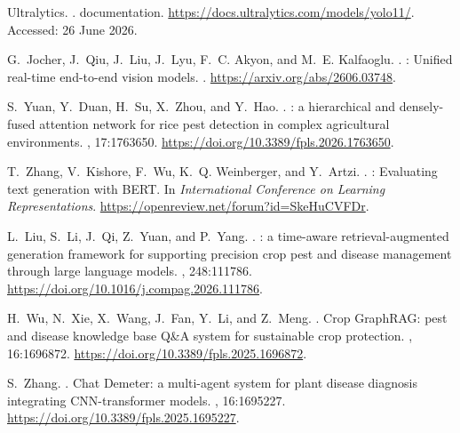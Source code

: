 ﻿\documentclass[11pt]{article}
\begin{document}
\begin{thebibliography}{}
Ultralytics.
.
 documentation.
\newblock \url{https://docs.ultralytics.com/models/yolo11/}. Accessed: 26 June 2026.

G.~Jocher, J.~Qiu, J.~Liu, J.~Lyu, F.~C. Akyon, and M.~E. Kalfaoglu.
.
: Unified real-time end-to-end vision models.
.
\newblock \url{https://arxiv.org/abs/2606.03748}.

S.~Yuan, Y.~Duan, H.~Su, X.~Zhou, and Y.~Hao.
.
: a hierarchical and densely-fused attention network for rice pest detection in complex agricultural environments.
, 17:1763650.
\newblock \url{https://doi.org/10.3389/fpls.2026.1763650}.

T.~Zhang, V.~Kishore, F.~Wu, K.~Q. Weinberger, and Y.~Artzi.
.
: Evaluating text generation with {BERT}.
\newblock In {\em International Conference on Learning Representations}.
\newblock \url{https://openreview.net/forum?id=SkeHuCVFDr}.

L.~Liu, S.~Li, J.~Qi, Z.~Yuan, and P.~Yang.
.
: a time-aware retrieval-augmented generation framework for supporting precision crop pest and disease management through large language models.
, 248:111786.
\newblock \url{https://doi.org/10.1016/j.compag.2026.111786}.

H.~Wu, N.~Xie, X.~Wang, J.~Fan, Y.~Li, and Z.~Meng.
.
\newblock Crop {GraphRAG}: pest and disease knowledge base {Q\&A} system for sustainable crop protection.
, 16:1696872.
\newblock \url{https://doi.org/10.3389/fpls.2025.1696872}.

S.~Zhang.
.
\newblock Chat {Demeter}: a multi-agent system for plant disease diagnosis integrating {CNN}-transformer models.
, 16:1695227.
\newblock \url{https://doi.org/10.3389/fpls.2025.1695227}.

\end{thebibliography}
\end{document}
